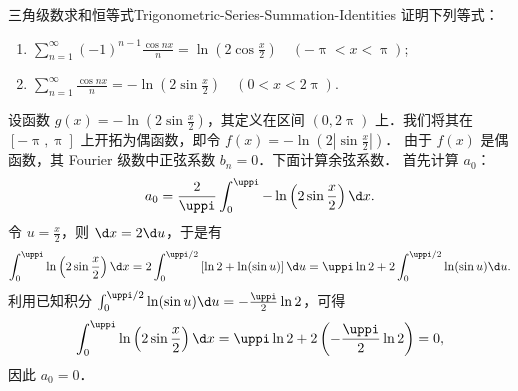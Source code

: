 \begin{problem}{三角级数求和恒等式}{Trigonometric-Series-Summation-Identities}
    证明下列等式：
    \begin{enumerate}
        \item $\sum_{n=1}^{\infty} (-1)^{n-1} \frac{\cos nx}{n} = \ln \left( 2\cos \frac{x}{2} \right) \quad (-\uppi < x < \uppi)$;
        \item $\sum_{n=1}^{\infty} \frac{\cos nx}{n} = -\ln \left( 2\sin \frac{x}{2} \right) \quad (0 < x < 2\uppi)$.
    \end{enumerate}
\end{problem}

\begin{myproof}

    设函数 $g(x) = -\ln \left( 2\sin \frac{x}{2} \right)$，其定义在区间 $(0, 2\uppi)$ 上．我们将其在 $[-\uppi, \uppi]$ 上开拓为偶函数，即令 $f(x) = -\ln \left( 2\left|\sin \frac{x}{2}\right| \right)$．
    由于 $f(x)$ 是偶函数，其 Fourier 级数中正弦系数 $b_n = 0$．下面计算余弦系数．
    首先计算 $a_0$：
    \begin{equation}\label{eq:a0-calc}
        a_0 = \frac{2}{\uppi} \int_{0}^{\uppi} -\ln \left( 2\sin \frac{x}{2} \right) \d x.
    \end{equation}
    令 $u = \frac{x}{2}$，则 $\d x = 2 \d u$，于是有
    \begin{equation}\label{eq:a0-integral}
        \int_{0}^{\uppi} \ln \left( 2\sin \frac{x}{2} \right) \d x = 2 \int_{0}^{\uppi/2} \left[ \ln 2 + \ln(\sin u) \right] \d u = \uppi \ln 2 + 2 \int_{0}^{\uppi/2} \ln(\sin u) \d u.
    \end{equation}
    利用已知积分 $\int_{0}^{\uppi/2} \ln(\sin u) \d u = -\frac{\uppi}{2} \ln 2$，可得
    \begin{equation}\label{eq:a0-zero}
        \int_{0}^{\uppi} \ln \left( 2\sin \frac{x}{2} \right) \d x = \uppi \ln 2 + 2 \left( -\frac{\uppi}{2} \ln 2 \right) = 0,
    \end{equation}
    因此 $a_0 = 0$．


\end{myproof}
